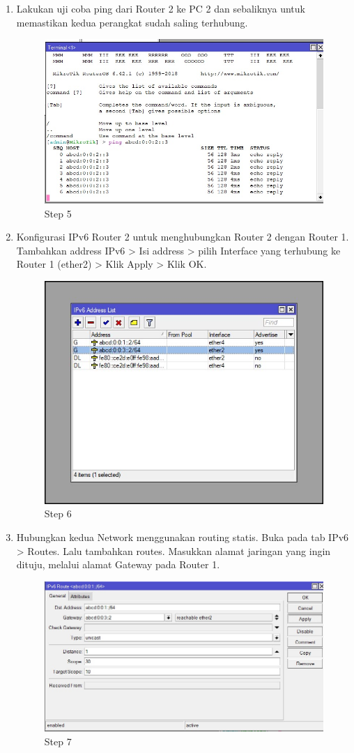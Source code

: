 \begin{enumerate}
	\item Lakukan uji coba ping dari Router 2 ke PC 2 dan sebaliknya untuk memastikan kedua perangkat
	sudah saling terhubung.	
	
	\begin{figure}[H]
		\centering
		\includegraphics[width=0.7\linewidth]{P5/img/2step5.jpg}
		\caption{Step 5}
		\label{fig:gambar1}
	\end{figure}

	\item Konfigurasi IPv6 Router 2 untuk menghubungkan Router 2 dengan Router 1. Tambahkan
	address IPv6 > Isi address > pilih Interface yang terhubung ke Router 1 (ether2) > Klik Apply > Klik OK.
	
	\begin{figure}[H]
		\centering
		\includegraphics[width=0.7\linewidth]{P5/img/2step6.jpg}
		\caption{Step 6}
		\label{fig:gambar1}
	\end{figure}

	\item Hubungkan kedua Network menggunakan routing statis. Buka pada tab IPv6 > Routes. Lalu
	tambahkan routes. Masukkan alamat jaringan yang ingin dituju, melalui alamat Gateway pada
	Router 1.
	
	\begin{figure}[H]
		\centering
		\includegraphics[width=0.7\linewidth]{P5/img/2step7.jpg}
		\caption{Step 7}
		\label{fig:gambar1}
	\end{figure}


\end{enumerate}
